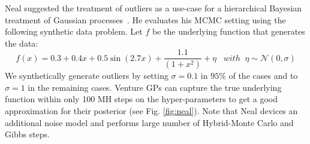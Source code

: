 \documentclass{article} %
\begin{document}
Neal suggested the treatment of outliers as a use-case for a hierarchical Bayesian treatment of Gaussian processes~\citeyearpar{neal1997monte}. He evaluates his MCMC setting using the following synthetic data problem. Let $f$ be the underlying function that generates the data:
\begin{equation}
f(x) =  0.3 + 0.4 x + 0.5 \sin(2.7x) + \frac{1.1}{(1+ x^2)} + \eta \;\;\; with\;\;\eta \sim \mathcal{N}(0,\sigma)
\end{equation}
We synthetically generate outliers by setting $\sigma = 0.1$ in $95\%$ of the cases and to $\sigma = 1$ in the remaining cases. Venture GPs can capture the true underlying function within only 100 MH steps on the hyper-parameters to get a good approximation for their posterior (see Fig. \ref{fig:neal}). Note that Neal devices an additional noise model and performs large number of Hybrid-Monte Carlo and Gibbs steps.  
\end{document}
